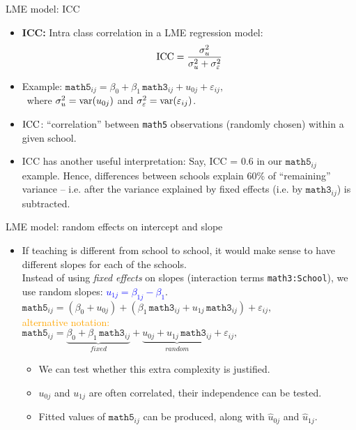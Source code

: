 \documentclass{beamer}
\begin{document}
\begin{frame}{LME model: ICC}
\small
\begin{itemize}
\item \textbf{ICC:} Intra class correlation in a LME regression model: \qquad
$$ \textnormal{ICC}=\frac{\sigma^2_u}{\sigma^2_u + \sigma^2_{\varepsilon}} $$
\medskip
\item Example: \qquad $\texttt{math5}_{ij} = \beta_{0} + \beta_1 \, \texttt{math3}_{ij} + u_{0j} + \varepsilon_{ij},$\\ \medskip
\qquad \qquad \qquad ~where $\sigma^2_u = \textnormal{var}(u_{0j})$ and $\sigma^2_{\varepsilon} = \textnormal{var}(\varepsilon_{ij})$.\\ \smallskip
\medskip
\item $\textnormal{ICC}$: ``correlation'' between \texttt{math5}  observations (randomly chosen) within a given school.
\bigskip 
\item ICC has another useful interpretation: Say, ICC = 0.6 in our $\texttt{math5}_{ij}$ example. Hence, differences between schools explain 60\% of ``remaining'' variance -- i.e. after the variance explained by fixed effects (i.e. by $\texttt{math3}_{ij}$) is subtracted.
\end{itemize}
\end{frame}
\begin{frame}{LME model: random effects on intercept and slope}
\small
\begin{itemize}
\item If teaching is different from school to school, it would make
sense to have different slopes for each of the schools.\\
\medskip
Instead of using \textit{fixed effects} on slopes (interaction terms \texttt{math3:School}), we use random slopes: \textcolor{blue}{$ u_{1j} = \beta_{1j} - \beta_1 $}. \\
\bigskip
$ \texttt{math5}_{ij} = \left( \beta_{0} + u_{0j} \right) + \left( \beta_1\, \texttt{math3}_{ij}  + u_{1j} \, \texttt{math3}_{ij}  \right) + \varepsilon_{ij}, $ \\
\bigskip
\textcolor{orange}{alternative notation:}\\
\medskip
$\texttt{math5}_{ij} = \underbrace{\beta_{0} + \beta_1 \,  \texttt{math3}_{ij}}_{\textit{fixed}}
+ \underbrace{u_{0j} + u_{1j} \, \texttt{math3}_{ij}}_{\textit{random}} 
+ \varepsilon_{ij}, $ \\
\bigskip
\begin{itemize}
\item We can test whether this extra complexity is justified.
\smallskip
\item ${u}_{0j}$ and ${u}_{1j}$ are often correlated, their independence can be tested.
\smallskip
\item Fitted values of $\texttt{math5}_{ij}$ can be produced, along with $\hat{u}_{0j}$ and $\hat{u}_{1j}$.
\end{itemize}
\end{itemize}
\end{frame}
\end{document}
